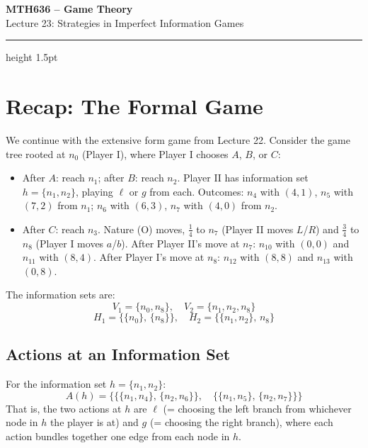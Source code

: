 \documentclass[12pt, a4paper]{article}
\begin{document}
\begin{center}
  {\LARGE\bfseries\sffamily\color{defblue} MTH636 -- Game Theory}\\[6pt]
  {\Large\sffamily Lecture 23: Strategies in Imperfect Information Games}\\[4pt]
\end{center}
\vspace{0.5cm}
\hrule height 1.5pt
\vspace{0.3cm}

\section{Recap: The Formal Game}

We continue with the extensive form game from Lecture 22. Consider the game tree rooted at $n_0$ (Player I), where Player I chooses $A$, $B$, or $C$:
\begin{itemize}
  \item After $A$: reach $n_1$; after $B$: reach $n_2$. Player II has information set $h = \{n_1, n_2\}$, playing $\ell$ or $g$ from each. Outcomes: $n_4$ with $(4,1)$, $n_5$ with $(7,2)$ from $n_1$; $n_6$ with $(6,3)$, $n_7$ with $(4,0)$ from $n_2$.
  \item After $C$: reach $n_3$. Nature (O) moves, $\tfrac{1}{4}$ to $n_7$ (Player II moves $L$/$R$) and $\tfrac{3}{4}$ to $n_8$ (Player I moves $a$/$b$). After Player II's move at $n_7$: $n_{10}$ with $(0,0)$ and $n_{11}$ with $(8,4)$. After Player I's move at $n_8$: $n_{12}$ with $(8,8)$ and $n_{13}$ with $(0,8)$.
\end{itemize}

The information sets are:
\[
  V_1 = \{n_0, n_8\}, \quad V_2 = \{n_1, n_2, n_8\}
\]
\[
  H_1 = \bigl\{\{n_0\},\, \{n_8\}\bigr\}, \quad
  H_2 = \bigl\{\{n_1, n_2\},\, n_8\bigr\}
\]

\subsection{Actions at an Information Set}

For the information set $h = \{n_1, n_2\}$:
\[
  A(h) = \bigl\{\{\{n_1, n_4\},\, \{n_2, n_6\}\},\quad \{\{n_1, n_5\},\, \{n_2, n_7\}\}\bigr\}
\]
That is, the two actions at $h$ are $\ell$ (= choosing the left branch from whichever node in $h$ the player is at) and $g$ (= choosing the right branch), where each action bundles together one edge from each node in $h$.
\end{document}
